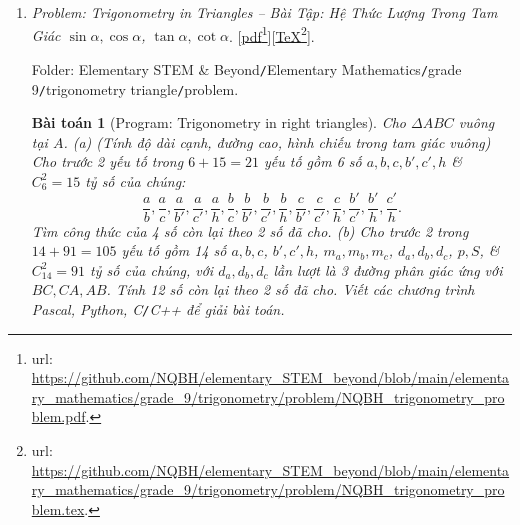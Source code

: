 \documentclass[12pt,oneside]{book}
\newtheorem{baitoan}{Bài toán}
\begin{document}
\begin{enumerate}
	Folder: {\sf Elementary STEM \& Beyond{\tt/}Elementary Mathematics{\tt/}grade 9{\tt/}root{\tt/}problem}.
	\begin{itemize}
		\item {\it Problem \& Solution: Root $\sqrt{f(x)},\sqrt[3]{f(x)},\sqrt[n]{f(x)}$ -- Bài Tập \& Lời Giải: Căn Thức $\sqrt{f(x)},\sqrt[3]{f(x)}$, $\sqrt[n]{f(x)}$}. [\href{https://github.com/NQBH/elementary_STEM_beyond/blob/main/elementary_mathematics/grade_9/root/solution/NQBH_root_solution.pdf}{pdf}\footnote{{\sc url}: \url{https://github.com/NQBH/elementary_STEM_beyond/blob/main/elementary_mathematics/grade_9/root/solution/NQBH_root_solution.pdf}.}][\href{https://github.com/NQBH/elementary_STEM_beyond/blob/main/elementary_mathematics/grade_9/root/solution/NQBH_root_solution.tex}{\TeX}\footnote{{\sc url}: \url{https://github.com/NQBH/elementary_STEM_beyond/blob/main/elementary_mathematics/grade_9/root/solution/NQBH_root_solution.tex}.}].
		
		Folder: {\sf Elementary STEM \& Beyond{\tt/}Elementary Mathematics{\tt/}grade 9{\tt/}root{\tt/}solution}.
	\end{itemize}	
	\item {\it Problem: Trigonometry in Triangles -- Bài Tập: Hệ Thức Lượng Trong Tam Giác $\sin\alpha,\cos\alpha$, $\tan\alpha,\cot\alpha$}. [\href{https://github.com/NQBH/elementary_STEM_beyond/blob/main/elementary_mathematics/grade_9/trigonometry/problem/NQBH_trigonometry_problem.pdf}{pdf}\footnote{{\sc url}: \url{https://github.com/NQBH/elementary_STEM_beyond/blob/main/elementary_mathematics/grade_9/trigonometry/problem/NQBH_trigonometry_problem.pdf}.}][\href{https://github.com/NQBH/elementary_STEM_beyond/blob/main/elementary_mathematics/grade_9/trigonometry/problem/NQBH_trigonometry_problem.tex}{\TeX}\footnote{{\sc url}: \url{https://github.com/NQBH/elementary_STEM_beyond/blob/main/elementary_mathematics/grade_9/trigonometry/problem/NQBH_trigonometry_problem.tex}.}].
	
	Folder: {\sf Elementary STEM \& Beyond{\tt/}Elementary Mathematics{\tt/}grade 9{\tt/}trigonometry triangle{\tt/}problem}.
	
	\begin{baitoan}[{\sf Program}: Trigonometry in right triangles]
		Cho $\Delta ABC$ vuông tại $A$. (a) {\rm(Tính độ dài cạnh, đường cao, hình chiếu trong tam giác vuông)} Cho trước 2 yếu tố trong $6 + 15 = 21$ yếu tố gồm 6 số $a,b,c,b',c',h$ \& $C_6^2 = 15$ tỷ số của chúng:
		\begin{equation*}
			\frac{a}{b},\frac{a}{c},\frac{a}{b'},\frac{a}{c'},\frac{a}{h},\frac{b}{c},\frac{b}{b'},\frac{b}{c'},\frac{b}{h},\frac{c}{b'},\frac{c}{c'},\frac{c}{h},\frac{b'}{c'},\frac{b'}{h},\frac{c'}{h}.
		\end{equation*}
		Tìm công thức của 4 số còn lại theo 2 số đã cho. (b) Cho trước 2 trong $14 + 91 = 105$ yếu tố gồm 14 số $a,b,c$, $b',c',h$, $m_a,m_b,m_c$, $d_a,d_b,d_c$, $p,S$, \& $C_{14}^2 = 91$ tỷ số của chúng, với $d_a,d_b,d_c$ lần lượt là 3 đường phân giác ứng với $BC,CA,AB$. Tính 12 số còn lại theo 2 số đã cho. Viết các chương trình {\sf Pascal, Python, C{\tt/}C++} để giải bài toán.
	\end{baitoan}
	

\end{enumerate}
\end{document}

